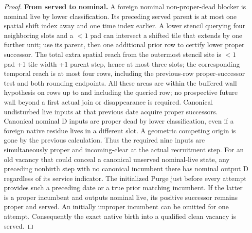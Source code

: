 \begin{proof}
\textbf{From served to nominal.} A foreign nominal non-proper-dead blocker is nominal live by lower classification. Its preceding served parent is at most one spatial shift index away and one time index earlier. A lower stencil querying four neighboring slots and a \(<1\) pad can intersect a shifted tile that extends by one further unit; use its parent, then one additional prior row to certify lower proper successor. The total extra spatial reach from the outermost stencil site is \(<1\) pad +1 tile width +1 parent step, hence at most three slots; the corresponding temporal reach is at most four rows, including the previous-row proper-successor test and both rounding endpoints. All these areas are within the buffered wall hypothesis on rows up to and including the queried row; no prospective future wall beyond a first actual join or disappearance is required. Canonical undisturbed live inputs at that previous date acquire proper successors. Canonical nominal D inputs are proper dead by lower classification, even if a foreign native residue lives in a different slot. A geometric competing origin is gone by the previous calculation. Thus the required nine inputs are simultaneously proper and incoming-clear at the actual recruitment step. For an old vacancy that could conceal a canonical unserved nominal-live state, any preceding nonbirth step with no canonical incumbent there has nominal output D regardless of its service indicator. The initialized Purge just before every attempt provides such a preceding date or a true prior matching incumbent. If the latter is a proper incumbent and outputs nominal live, its positive successor remains proper and served. An initially improper incumbent can be omitted for one attempt. Consequently the exact native birth into a qualified clean vacancy is served.


\end{proof}
